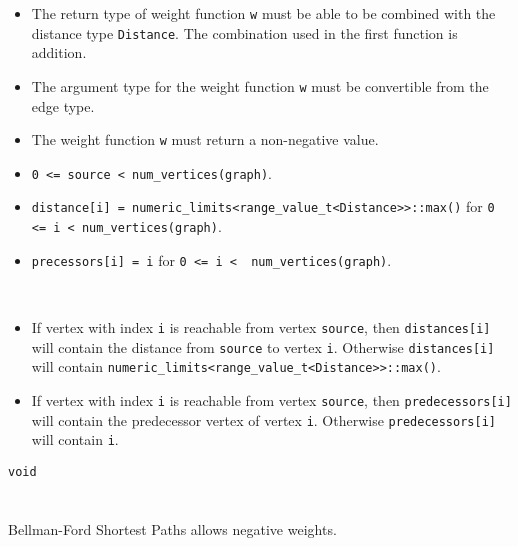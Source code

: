 \begin{itemdescr}
      \pnum\mandates
      \begin{itemize}
            \item
                  The return type of weight function \lstinline{w} must be able to
                  be combined with the distance type \lstinline{Distance}. The combination
                  used in the first function is addition.
            \item
                  The argument type for the weight
                  function \lstinline{w} must be convertible from the edge type.
            \item
                  The weight function \lstinline{w} must return a non-negative value.
      \end{itemize}
      \pnum\preconditions
      \begin{itemize}
            \item
                  \lstinline{0 <= source < num_vertices(graph)}. 
                  \\ 
            \item
                  \lstinline{distance[i] = numeric_limits<range_value_t<Distance>>::max()}
                  for \lstinline{0 <= i < num_vertices(graph)}.  
                  \\ 
            \item
                  \lstinline{precessors[i] = i} for \lstinline{0 <= i <  num_vertices(graph)}.
      \end{itemize}
      \pnum\effects \\
      \pnum\result
      \begin{itemize}
            \item
                  If vertex with index \lstinline{i} is reachable from vertex \lstinline{source}, then
                  \lstinline{distances[i]} will contain the distance from \lstinline{source} to vertex
                  \lstinline{i}.  Otherwise \lstinline{distances[i]} will contain
                  \lstinline{numeric_limits<range_value_t<Distance>>::max()}.
            \item
                  If vertex with index \lstinline{i} is reachable
                  from vertex \lstinline{source}, then \lstinline{predecessors[i]} will contain the
                  predecessor vertex of vertex \lstinline{i}. Otherwise \lstinline{predecessors[i]} will contain
                  \lstinline{i}.
      \end{itemize}
      \pnum\returns \lstinline{void} \\
      \pnum\throws \\
      \pnum\complexity \\
      \pnum\remarks Bellman-Ford Shortest Paths allows negative weights. \\
\end{itemdescr}


